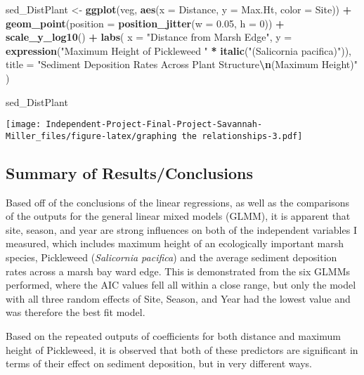\documentclass[
]{article}
\newenvironment{Shaded}{\begin{snugshade}}{\end{snugshade}}
\newcommand{\AttributeTok}[1]{\textcolor[rgb]{0.13,0.29,0.53}{#1}}
\newcommand{\DecValTok}[1]{\textcolor[rgb]{0.00,0.00,0.81}{#1}}
\newcommand{\FloatTok}[1]{\textcolor[rgb]{0.00,0.00,0.81}{#1}}
\newcommand{\FunctionTok}[1]{\textcolor[rgb]{0.13,0.29,0.53}{\textbf{#1}}}
\newcommand{\NormalTok}[1]{#1}
\newcommand{\OtherTok}[1]{\textcolor[rgb]{0.56,0.35,0.01}{#1}}
\newcommand{\SpecialCharTok}[1]{\textcolor[rgb]{0.81,0.36,0.00}{\textbf{#1}}}
\newcommand{\StringTok}[1]{\textcolor[rgb]{0.31,0.60,0.02}{#1}}
\begin{document}
\begin{Shaded}
\begin{Highlighting}[]
\NormalTok{sed\_DistPlant }\OtherTok{\textless{}{-}} \FunctionTok{ggplot}\NormalTok{(veg, }\FunctionTok{aes}\NormalTok{(}\AttributeTok{x =}\NormalTok{ Distance, }\AttributeTok{y =}\NormalTok{ Max.Ht, }\AttributeTok{color =}\NormalTok{ Site)) }\SpecialCharTok{+} 
  \FunctionTok{geom\_point}\NormalTok{(}\AttributeTok{position =} \FunctionTok{position\_jitter}\NormalTok{(}\AttributeTok{w =} \FloatTok{0.05}\NormalTok{, }\AttributeTok{h =} \DecValTok{0}\NormalTok{)) }\SpecialCharTok{+}
  \FunctionTok{scale\_y\_log10}\NormalTok{() }\SpecialCharTok{+} 
  \FunctionTok{labs}\NormalTok{(}
    \AttributeTok{x =} \StringTok{"Distance from Marsh Edge"}\NormalTok{,}
    \AttributeTok{y =} \FunctionTok{expression}\NormalTok{(}\StringTok{"Maximum Height of Pickleweed "} \SpecialCharTok{*} \FunctionTok{italic}\NormalTok{(}\StringTok{"(Salicornia pacifica)"}\NormalTok{)),}
    \AttributeTok{title =} \StringTok{"Sediment Deposition Rates Across Plant Structure}\SpecialCharTok{\textbackslash{}n}\StringTok{(Maximum Height)"}
\NormalTok{  )}

\NormalTok{sed\_DistPlant}
\end{Highlighting}
\end{Shaded}

\texttt{[image: Independent-Project-Final-Project-Savannah-Miller\_files/figure-latex/graphing the relationships-3.pdf]}

\subsection{Summary of
Results/Conclusions}\label{summary-of-resultsconclusions}

Based off of the conclusions of the linear regressions, as well as the
comparisons of the outputs for the general linear mixed models (GLMM),
it is apparent that site, season, and year are strong influences on both
of the independent variables I measured, which includes maximum height
of an ecologically important marsh species, Pickleweed (\emph{Salicornia
pacifica}) and the average sediment deposition rates across a marsh bay
ward edge. This is demonstrated from the six GLMMs performed, where the
AIC values fell all within a close range, but only the model with all
three random effects of Site, Season, and Year had the lowest value and
was therefore the best fit model.

Based on the repeated outputs of coefficients for both distance and
maximum height of Pickleweed, it is observed that both of these
predictors are significant in terms of their effect on sediment
deposition, but in very different ways.
\end{document}
